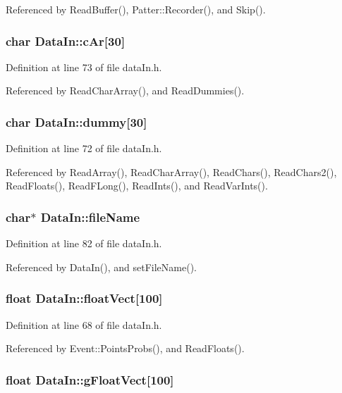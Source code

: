 Referenced by Read\-Buffer(), Patter::Recorder(), and Skip().
\subsubsection{\setlength{\rightskip}{0pt plus 5cm}char {\bf Data\-In::c\-Ar}[30]}\label{classDataIn_o7}




Definition at line 73 of file data\-In.h.

Referenced by Read\-Char\-Array(), and Read\-Dummies().
\subsubsection{\setlength{\rightskip}{0pt plus 5cm}char {\bf Data\-In::dummy}[30]}\label{classDataIn_o6}




Definition at line 72 of file data\-In.h.

Referenced by Read\-Array(), Read\-Char\-Array(), Read\-Chars(), Read\-Chars2(), Read\-Floats(), Read\-FLong(), Read\-Ints(), and Read\-Var\-Ints().
\subsubsection{\setlength{\rightskip}{0pt plus 5cm}char$\ast$ {\bf Data\-In::file\-Name}}\label{classDataIn_o14}




Definition at line 82 of file data\-In.h.

Referenced by Data\-In(), and set\-File\-Name().
\subsubsection{\setlength{\rightskip}{0pt plus 5cm}float {\bf Data\-In::float\-Vect}[100]}\label{classDataIn_o2}




Definition at line 68 of file data\-In.h.

Referenced by Event::Points\-Probs(), and Read\-Floats().
\subsubsection{\setlength{\rightskip}{0pt plus 5cm}float {\bf Data\-In::g\-Float\-Vect}[100]}\label{classDataIn_o3}




